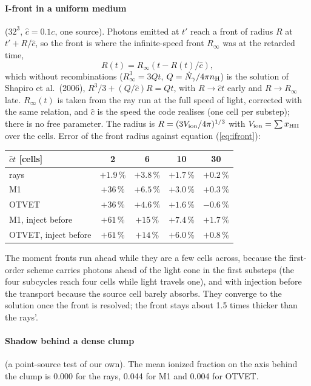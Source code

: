 \documentclass[11pt]{article}
\newcommand{\chat}{\hat{c}}
\begin{document}
\paragraph{I-front in a uniform medium} ($32^3$, $\chat=0.1c$, one source). Photons emitted at $t'$ reach
a front of radius $R$ at $t'+R/\chat$, so the front is where the infinite-speed front $R_\infty$ was at the
retarded time,
\begin{equation}
R(t)=R_\infty\!\left(t-R(t)/\chat\right),\label{eq:ifront}
\end{equation}
which without recombinations ($R_\infty^3=3Qt$, $Q=\dot N_\gamma/4\pi n_{\rm H}$) is the solution of
Shapiro et al.\ (2006), $R^3/3+(Q/\chat)R=Qt$, with $R\to\chat t$ early and $R\to R_\infty$ late.
$R_\infty(t)$ is taken from the ray run at the full speed of light, corrected with the same relation, and
$\chat$ is the speed the code realises (one cell per substep); there is no free parameter. The radius is
$R=(3V_{\rm ion}/4\pi)^{1/3}$ with $V_{\rm ion}=\sum x_{\rm HII}$ over the cells. Error of the front radius
against equation (\ref{eq:ifront}):
\begin{center}
\begin{tabular}{lcccc}
\toprule
$\chat t$ [cells] & 2 & 6 & 10 & 30\\
\midrule
rays & $+1.9\,\%$ & $+3.8\,\%$ & $+1.7\,\%$ & $+0.2\,\%$\\
M1 & $+36\,\%$ & $+6.5\,\%$ & $+3.0\,\%$ & $+0.3\,\%$\\
OTVET & $+36\,\%$ & $+4.6\,\%$ & $+1.6\,\%$ & $-0.6\,\%$\\
M1, inject before & $+61\,\%$ & $+15\,\%$ & $+7.4\,\%$ & $+1.7\,\%$\\
OTVET, inject before & $+61\,\%$ & $+14\,\%$ & $+6.0\,\%$ & $+0.8\,\%$\\
\bottomrule
\end{tabular}
\end{center}
The moment fronts run ahead while they are a few cells across, because the first-order scheme carries
photons ahead of the light cone in the first substeps (the four subcycles reach four cells while light
travels one), and with injection before the transport because the source cell barely absorbs. They converge
to the solution once the front is resolved; the front stays about 1.5 times thicker than the rays'.

\paragraph{Shadow behind a dense clump} (a point-source test of our own). The mean ionized fraction on the
axis behind the clump is 0.000 for the rays, 0.044 for M1 and 0.004 for OTVET.
\end{document}
